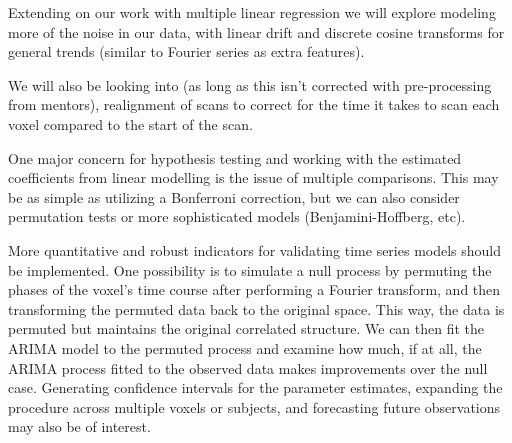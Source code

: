 \par \indent Extending on our work with multiple linear regression we will explore modeling more of the noise in our data, with linear drift and discrete cosine transforms for general trends (similar to Fourier series as extra features). 
\par We will also be looking into (as long as this isn’t corrected with pre-processing from mentors), realignment of scans to correct for the time it takes to scan each voxel compared to the start of the scan.
\par One major concern for hypothesis testing and working with the estimated coefficients from linear modelling is the issue of multiple comparisons. This may be as simple as utilizing a Bonferroni correction, but we can also consider permutation tests or more sophisticated models (Benjamini-Hoffberg, etc). 
\par More quantitative and robust indicators for validating time series models should be implemented. One possibility is to simulate a null process by permuting the phases of the voxel’s time course after performing a Fourier transform, and then transforming the permuted data back to the original space. This way, the data is permuted but maintains the original correlated structure. We can then fit the ARIMA model to the permuted process and examine how much, if at all, the ARIMA process fitted to the observed data makes improvements over the null case. Generating confidence intervals for the parameter estimates, expanding the procedure across multiple voxels or subjects, and forecasting future observations may also be of interest. 
